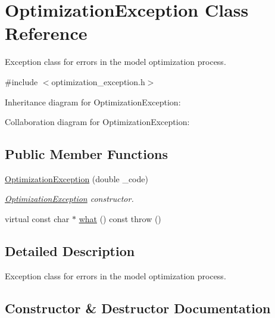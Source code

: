 \hypertarget{classOptimizationException}{}\section{Optimization\+Exception Class Reference}
\label{classOptimizationException}


Exception class for errors in the model optimization process.  




{\ttfamily \#include $<$optimization\+\_\+exception.\+h$>$}



Inheritance diagram for Optimization\+Exception\+:


Collaboration diagram for Optimization\+Exception\+:
\subsection*{Public Member Functions}
\begin{DoxyCompactItemize}
\item 
\hyperlink{classOptimizationException_aabbd61bc4c3048f9d2f9847e42f56309}{Optimization\+Exception} (double \+\_\+code)
\begin{DoxyCompactList}\small\item\em \hyperlink{classOptimizationException}{Optimization\+Exception} constructor. \end{DoxyCompactList}\item 
virtual const char $\ast$ \hyperlink{classOptimizationException_af95ff8790737f771a3a9d96c2ac584ab}{what} () const   throw ()
\end{DoxyCompactItemize}


\subsection{Detailed Description}
Exception class for errors in the model optimization process. 

\subsection{Constructor \& Destructor Documentation}
\hypertarget{classOptimizationException_aabbd61bc4c3048f9d2f9847e42f56309}{}
